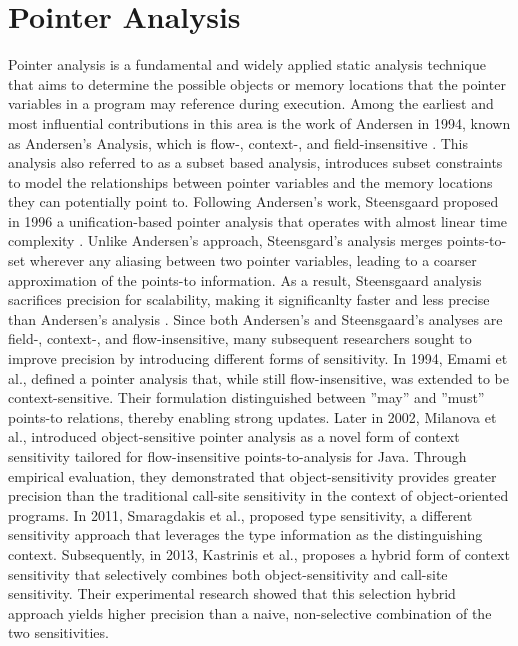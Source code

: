 \section{Pointer Analysis}

Pointer analysis is a fundamental and widely applied static analysis technique that aims to determine the possible objects or memory locations that the pointer variables in a program may reference during execution.
Among the earliest and most influential contributions in this area is the work of Andersen in 1994, known as Andersen's Analysis, which is flow-, context-, and field-insensitive \cite{andersen1994program}. 
This analysis also referred to as a subset based analysis, introduces subset constraints to model the relationships between pointer variables and the memory locations they can potentially point to. 
Following Andersen's work, Steensgaard proposed in 1996 a unification-based pointer analysis that operates with almost linear time complexity \cite{steensgaard1996points}.
Unlike Andersen's approach, Steensgard's analysis merges points-to-set wherever any aliasing between two pointer variables, leading to a coarser approximation of the points-to information. 
As a result, Steensgaard analysis sacrifices precision for scalability, making it significanlty faster and less precise than Andersen's analysis \cite{shapiro1997effects}.
Since both Andersen's and Steensgaard's analyses are field-, context-, and flow-insensitive, many subsequent researchers sought to improve precision by introducing different forms of sensitivity.
In 1994, Emami et al., \cite{emami1994context} defined a pointer analysis that, while still flow-insensitive, was extended to be context-sensitive. 
Their formulation distinguished between ''may'' and ''must'' points-to relations, thereby enabling strong updates.
Later in 2002, Milanova et al., \cite{milanova2002parameterized} introduced object-sensitive pointer analysis as a novel form of context sensitivity tailored for flow-insensitive points-to-analysis for Java.
Through empirical evaluation, they demonstrated that object-sensitivity provides greater precision than the traditional call-site sensitivity in the context of object-oriented programs.
In 2011, Smaragdakis et al., \cite{smaragdakis2011pick} proposed type sensitivity, a different sensitivity approach that leverages the type information as the distinguishing context.
Subsequently, in 2013, Kastrinis et al., \cite{kastrinis2013hybrid} proposes a hybrid form of context sensitivity that selectively combines both object-sensitivity and call-site sensitivity.
Their experimental research showed that this selection hybrid approach yields higher precision than a naive, non-selective combination of the two sensitivities.

